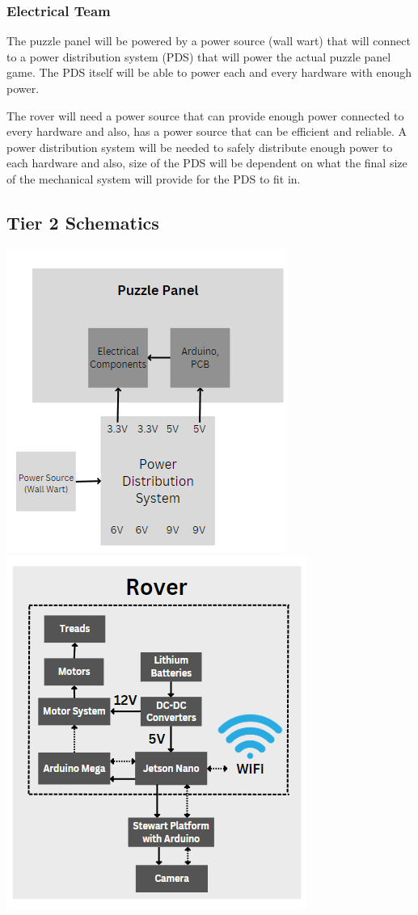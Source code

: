 \documentclass[a4paper, 10pt]{article}
\begin{document}
\subsubsection{Electrical Team}
	
The puzzle panel will be powered by a power source (wall wart) that will connect to a power distribution system (PDS) that will power the actual puzzle panel game. The PDS itself will be able to power each and every hardware with enough power.

	The rover will need a power source that can provide enough power connected to every hardware and also, has a power source that can be efficient and reliable. A power distribution system will be needed to safely distribute enough power to each hardware and also, size of the PDS will be dependent on what the final size of the mechanical system will provide for the PDS to fit in.  

	\subsection{Tier 2 Schematics}
\includegraphics[scale=0.8]{Puzzle panel simplified}
\includegraphics[scale=0.8]{Rover schematic simplified}
\end{document}
